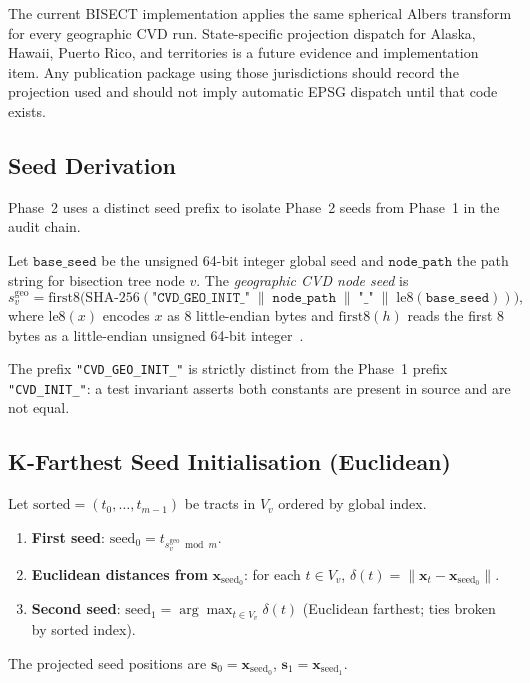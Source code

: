 \begin{remark}
The current BISECT implementation applies the same spherical Albers transform
for every geographic CVD run. State-specific projection dispatch for Alaska,
Hawaii, Puerto Rico, and territories is a future evidence and implementation
item. Any publication package using those jurisdictions should record the
projection used and should not imply automatic EPSG dispatch until that code
exists.
\end{remark}

\subsection{Seed Derivation}

Phase~2 uses a distinct seed prefix to isolate Phase~2 seeds from Phase~1
in the audit chain.

\begin{definition}
\label{def:geo-seed}
Let $\mathtt{base\_seed}$ be the unsigned 64-bit integer global seed and
$\mathtt{node\_path}$ the path string for bisection tree node $v$.
The \emph{geographic CVD node seed} is
\[
  s_v^{\mathrm{geo}} = \mathrm{first8}\bigl(
    \mathrm{SHA\text{-}256}(
      \texttt{"CVD\_GEO\_INIT\_"} \;\|\; \mathtt{node\_path}
      \;\|\; \texttt{"\_"} \;\|\; \mathrm{le8}(\mathtt{base\_seed})
    )
  \bigr),
\]
where $\mathrm{le8}(x)$ encodes $x$ as 8 little-endian bytes and
$\mathrm{first8}(h)$ reads the first 8 bytes as a little-endian
unsigned 64-bit integer~\citep{sha256nist}.
\end{definition}

The prefix \texttt{"CVD\_GEO\_INIT\_"} is strictly distinct from the Phase~1
prefix \texttt{"CVD\_INIT\_"}: a test invariant asserts both constants are
present in source and are not equal.

\subsection{K-Farthest Seed Initialisation (Euclidean)}

\begin{definition}
\label{def:geo-kfarthest}
Let $\mathrm{sorted} = (t_0,\ldots,t_{m-1})$ be tracts in $V_v$ ordered by
global index.
\begin{enumerate}
\item \textbf{First seed}: $\mathrm{seed}_0 = t_{s_v^{\mathrm{geo}} \bmod m}$.
\item \textbf{Euclidean distances from} $\mathbf{x}_{\mathrm{seed}_0}$:
  for each $t \in V_v$, $\delta(t) = \|\mathbf{x}_t - \mathbf{x}_{\mathrm{seed}_0}\|$.
\item \textbf{Second seed}: $\mathrm{seed}_1 = \arg\max_{t \in V_v} \delta(t)$
  (Euclidean farthest; ties broken by sorted index).
\end{enumerate}
The projected seed positions are $\mathbf{s}_0 = \mathbf{x}_{\mathrm{seed}_0}$,
$\mathbf{s}_1 = \mathbf{x}_{\mathrm{seed}_1}$.
\end{definition}

